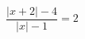 \begin{ex}[type=equation]
	\begin{condition}
		$\dfrac{\big | x +2\big| - 4}{\big|x\big| - 1} = 2$
	\end{condition}
	\answer{$\left\{0\right\}$}
\end{ex}